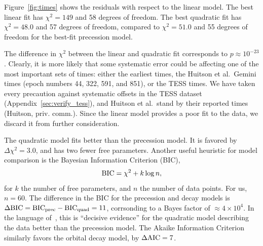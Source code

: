 \documentclass[12pt,twocolumn,tighten]{aastex62}
\begin{document}

Figure~\ref{fig:times} shows the residuals with respect to the linear
model.  The best linear fit has $\chi^2 = 149$ and 58 degrees of
freedom.  The best quadratic fit has $\chi^2 = 48.0$ and 57
degrees of freedom, compared to $\chi^2 = 51.0$
and 55 degrees of freedom for the best-fit precession model.

The difference in $\chi^2$ between the linear and quadratic fit
corresponds to $p \approx 10^{-23}$. %
Clearly, it is more likely that some systematic error could be
affecting one of the most important sets of times: either the earliest
times, the Huitson et al.\ Gemini times (epoch numbers 44, 322, 591,
and 851), or the TESS times.  We have taken every precaution against
systematic offsets in the TESS dataset
(Appendix~\ref{sec:verify_tess}), and Huitson et al.\ stand by their
reported times (Huitson, priv.  comm.).  Since the linear model
provides a poor fit to the data, we discard it from further
consideration.

The quadratic model fits better than the precession model.  It is
favored by $\Delta \chi^2 = 3.0$, and has two
fewer free parameters.  Another useful heuristic for model comparison is
the Bayesian Information Criterion (BIC),
\begin{equation}
  {\rm BIC} = \chi^2 + k\log n,
\end{equation}
for $k$ the number of free parameters, and $n$ the number of data
points. For us, $n=60$.  The difference in the BIC for the precession
and decay models is $\Delta {\rm BIC} = {\rm BIC}_{\rm prec} - {\rm
BIC}_{\rm quad} = 11$, corrsonding to a Bayes factor of $\approx
4\times10^{4}$.  In the language of~\citet{kass_bayes_1995}, this is
``decisive evidence'' for the quadratic model describing the data better
than the precession model.  The Akaike Information Criterion
similarly favors the orbital decay model, by $\Delta {\rm AIC} = 7$.
\end{document}
